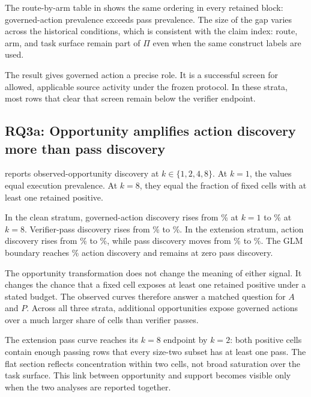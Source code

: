 

The route-by-arm table in  shows the same ordering in every retained block: governed-action prevalence exceeds pass prevalence. The size of the gap varies across the historical conditions, which is consistent with the claim index: route, arm, and task surface remain part of $\Pi$ even when the same construct labels are used.

The result gives governed action a precise role. It is a successful screen for allowed, applicable source activity under the frozen protocol. In these strata, most rows that clear that screen remain below the verifier endpoint.

\subsection{RQ3a: Opportunity amplifies action discovery more than pass discovery}

 reports observed-opportunity discovery at $k\in\{1,2,4,8\}$. At $k=1$, the values equal execution prevalence. At $k=8$, they equal the fraction of fixed cells with at least one retained positive.

In the clean stratum, governed-action discovery rises from \CleanActionDiscoveryKOne\% at $k=1$ to \CleanActionDiscoveryKEight\% at $k=8$. Verifier-pass discovery rises from \CleanPassDiscoveryKOne\% to \CleanPassDiscoveryKEight\%. In the extension stratum, action discovery rises from \ExtensionActionDiscoveryKOne\% to \ExtensionActionDiscoveryKEight\%, while pass discovery moves from \ExtensionPassDiscoveryKOne\% to \ExtensionPassDiscoveryKEight\%. The GLM boundary reaches \GLMActionDiscoveryKEight\% action discovery and remains at zero pass discovery.



The opportunity transformation does not change the meaning of either signal. It changes the chance that a fixed cell exposes at least one retained positive under a stated budget. The observed curves therefore answer a matched question for $A$ and $P$. Across all three strata, additional opportunities expose governed actions over a much larger share of cells than verifier passes.

The extension pass curve reaches its $k=8$ endpoint by $k=2$: both positive cells contain enough passing rows that every size-two subset has at least one pass. The flat section reflects concentration within two cells, not broad saturation over the task surface. This link between opportunity and support becomes visible only when the two analyses are reported together.

